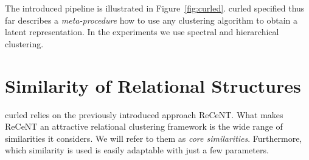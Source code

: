  
The introduced pipeline is illustrated in Figure~\ref{fig:curled}.
\gls{curled} specified thus far describes a \textit{meta-procedure} how to use any clustering algorithm to obtain a latent representation.
In the experiments we use spectral and hierarchical clustering.



\section{Similarity of Relational Structures}
\label{sec:Clustering}


\gls{curled} relies on the previously introduced approach ReCeNT.
What makes ReCeNT an attractive relational clustering framework is the wide range of similarities it considers.
We will refer to them as \textit{core similarities}.
Furthermore, which similarity is used is easily adaptable with just a few parameters.








